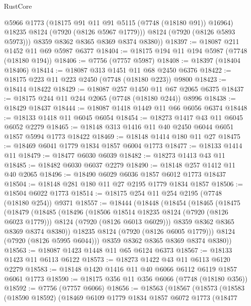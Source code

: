 \begin{lexlean}{RustCore}
\begin{coremodule}
            @5966
            @1773
            (@18175 @91 @11 @91 @5115 (@7748 (@18180 @91)) @16964)
            @18235
            @8124
            (@7920 (@8126 @5967 @1779)))
          @8124
          (@7920 (@8126 @5893 @5973)))
        @8359
        @8362
        @8365
        @8369
        @8374
        @8380))
@18397 := @18087 @211 @1452 @11 @69 @5987 @6377
@18404 := @18175 @194 @11 @194 @5987 (@7748 (@18180 @194))
@18406 := @7756 (@7757 @5987)
@18408 := @18397 (@18404 @18406)
@18414 := @18087 @313 @1451 @11 @68 @2450 @6376
@18422 := @18175 @223 @11 @223 @2450 (@7748 (@18180 @223)) @9800
@18423 := @18414 @18422
@18429 := @18087 @257 @1450 @11 @67 @2065 @6375
@18437 := @18175 @244 @11 @244 @2065 (@7748 (@18180 @244)) @8996
@18438 := @18429 @18437
@18444 := @18087 @1418 @1449 @11 @66 @6056 @6374
@18448 := @18133 @1418 @11 @6045 @6054
@18454 := @18273 @1417 @43 @11 @6045 @6052 @2279
@18465 := @18148 @313 @1416 @11 @40 @2450 @6044 @6051 @1857 @5994 @1773 @18422
@18469 := @18148 @1414 @180 @11 @27
@18475 := @18469 @6041 @1779 @1834 @1857 @6004 @1773
@18477 := @18133 @1414 @11
@18479 := @18477 @6030 @6039
@18482 := @18273 @1413 @43 @11
@18485 := @18482 @6030 @6037 @2279
@18490 := @18148 @257 @1412 @11 @40 @2065
@18496 := @18490 @6029 @6036 @1857 @6012 @1773 @18437
@18504 := @18148 @281 @180 @11 @27 @2195 @1779 @1834 @1857
@18506 := @18504 @6022 @1773
@18514 := @18175 @254 @11 @254 @2195 (@7748 (@18180 @254)) @9371
@18557 := @18444
    (@18448
      (@18454
        (@18465
          (@18475
            (@18479
              (@18485
                (@18496
                  (@18506 @18514 @18235 @8124 (@7920 (@8126 @6023 @1779)))
                  @8124
                  (@7920 (@8126 @6013 @6029)))
                @8359
                @8362
                @8365
                @8369
                @8374
                @8380))
            @18235
            @8124
            (@7920 (@8126 @6005 @1779)))
          @8124
          (@7920 (@8126 @5995 @6044)))
        @8359
        @8362
        @8365
        @8369
        @8374
        @8380))
@18563 := @18087 @1423 @1448 @11 @65 @6124 @6373
@18567 := @18133 @1423 @11 @6113 @6122
@18573 := @18273 @1422 @43 @11 @6113 @6120 @2279
@18583 := @18148 @1420 @1416 @11 @40 @6066 @6112 @6119 @1857 @6061 @1773
@18590 := @18175 @356 @11 @356 @6066 (@7748 (@18180 @356))
@18592 := @7756 (@7757 @6066)
@18656 := @18563
    (@18567
      (@18573
        (@18583
          (@18590 @18592)
          (@18469
            @6109
            @1779
            @1834
            @1857
            @6072
            @1773
            (@18477

\end{coremodule}
\end{lexlean}
